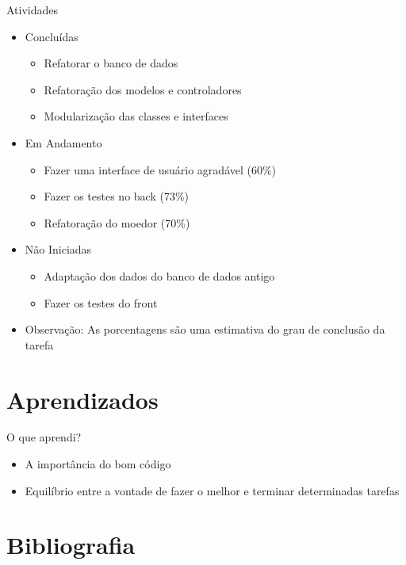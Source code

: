 \documentclass[aspectratio=43,display]{beamer}
\begin{document}
  \begin{frame}{Atividades}
    \begin{itemize}
      \item Concluídas
      \begin{itemize}
        \item Refatorar o banco de dados \pause
        \item Refatoração dos modelos e controladores \pause
        \item Modularização das classes e interfaces \pause
      \end{itemize}
      \item Em Andamento
      \begin{itemize}
        \item Fazer uma interface de usuário agradável (60\%) \pause
        \item Fazer os testes no back (73\%) \pause
        \item Refatoração do moedor (70\%) \pause
      \end{itemize}
      \item Não Iniciadas
      \begin{itemize}
        \item Adaptação dos dados do banco de dados antigo \pause
        \item Fazer os testes do front \pause
      \end{itemize}
      \item Observação: As porcentagens são uma estimativa do grau de conclusão da tarefa
    \end{itemize}
  \end{frame}

  \section{Aprendizados}\label{sec:aprendizados}

  \begin{frame}{O que aprendi?}
    \begin{itemize}
      \item A importância do bom código \pause
      \item Equilíbrio entre a vontade de fazer o melhor e terminar determinadas tarefas
    \end{itemize}
  \end{frame}

  \section{Bibliografia}\label{sec:bibliografia}
\end{document}
